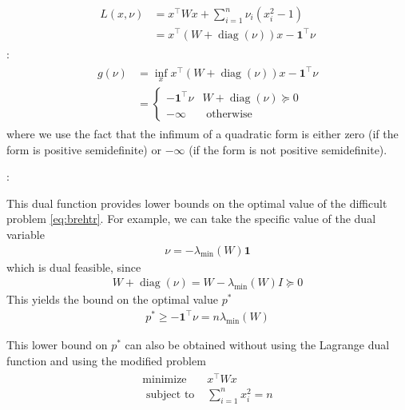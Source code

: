 \documentclass{article}
\begin{document}
\begin{align*}
\begin{aligned}
L(x, \nu) &=x^{\top} W x+\sum_{i=1}^{n} \nu_{i}\left(x_{i}^{2}-1\right) \\
&=x^{\top}(W+\operatorname{diag}(\nu)) x-\mathbf{1}^{\top} \nu
\end{aligned}
\end{align*}
:
\begin{align*}
\begin{aligned}
g(\nu) &=\inf _{x} x^{\top}(W+\operatorname{diag}(\nu)) x-\mathbf{1}^{\top} \nu \\
&= \begin{cases}-\mathbf{1}^{\top} \nu & W+\operatorname{diag}(\nu) \succeq 0 \\
-\infty & \text { otherwise }\end{cases}
\end{aligned}
\end{align*}
where we use the fact that the infimum of a quadratic form is either zero (if the form is positive semidefinite) or $-\infty$ (if the form is not positive semidefinite).

:

This dual function provides lower bounds on the optimal value of the difficult problem \cref{eq:brehtr}. For example, we can take the specific value of the dual variable
\begin{align*}
\nu=-\lambda_{\min }(W) \mathbf{1}
\end{align*}
which is dual feasible, since
\begin{align*}
W+\operatorname{diag}(\nu)=W-\lambda_{\min }(W) I \succeq 0
\end{align*}
This yields the bound on the optimal value $p^* $
\begin{align*}
p^*  \geq-\mathbf{1}^{\top} \nu=n \lambda_{\min }(W)
\end{align*}
\begin{rema}
This lower bound on $p^* $ can also be obtained without using the Lagrange dual function and using  the modified problem
\begin{align*}
\begin{array}{ll}
\operatorname{minimize} & x^{\top} W x \\
\text { subject to } & \sum_{i=1}^{n} x_{i}^{2}=n
\end{array}
\end{align*}
\end{rema} 
\end{document}
